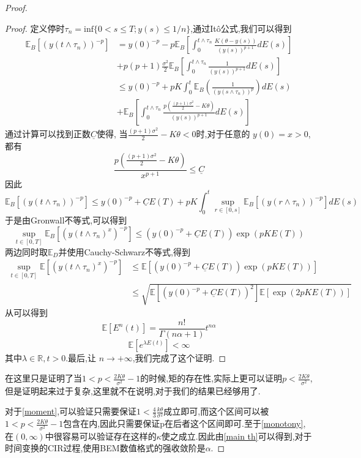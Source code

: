 \begin{proof}
\begin{proposition}
	\end{proposition}
	\begin{proof}
		定义停时$\tau_{n}=\mathrm{inf}\{0<s\leq T;y(s)\leq1/n\}$,通过It\^{o}公式,我们可以得到
		$$\begin{aligned}
			\mathbb{E}_B\left[(y(t\wedge\tau_{n}))^{-p}\right] &=y(0)^{-p}-p\mathbb{E}_B\left[\int_{0}^{t\wedge\tau_{n}}\frac{K(\theta-y(s))}{(y(s))^{p+1}}dE(s)\right]\\
			&+p(p+1)\frac{\sigma^{2}}{2}\mathbb{E}_B\left[\int_{0}^{t\wedge\tau_{n}}\frac{1}{(y(s))^{p+1}}dE(s)\right] \\
			&\leq y(0)^{-p}+pK\int_{0}^{t}\mathbb{E}_B\left(\frac{1}{(y(s\wedge\tau_{n}))^{p}}
			\right)dE(s) \\
			&+\mathbb{E}_B\left[\int_0^{t\wedge\tau_n}\frac{p\left(\frac{(p+1)\sigma^2}{2}-K\theta\right)}{(y(s))^{p+1}}dE(s)\right]
		\end{aligned}$$
		通过计算可以找到正数$\underline C$使得, 当$\frac{(p+1)\sigma^2}{2}-K\theta<0$时,对于任意的 $y(0)=x>0$,都有
		$$\frac{p\left(\frac{(p+1)\sigma^2}{2}-K\theta\right)}{x^{p+1}}\leq \underline C$$
		因此
		$$\mathbb{E}_B\left[(y(t\wedge\tau_n))^{-p}\right]\leq y(0)^{-p}+\underline{C}E(T)+pK\int_0^t\sup_{r\in[0,s]}\mathbb{E}_B\left[(y(r\wedge\tau_n))^{-p}\right]dE(s)$$
		于是由Gronwall不等式,可以得到
		$$\sup\limits_{t\in[0,T]}\mathbb{E}_B\left[(y(t\wedge\tau_n)^x)^{-p}\right]\leq\left(y(0)^{-p}+\underline{C}E(T)\right)\exp(pKE(T))$$
		两边同时取$\mathbb{E}_D$并使用Cauchy-Schwarz不等式,得到
		$$\begin{aligned}
			\sup\limits_{t\in[0,T]}\mathbb{E}\left[(y(t\wedge\tau_n)^x)^{-p}\right]&\leq\mathbb{E}\left[\left(y(0)^{-p}+\underline{C}E(T)\right)\exp(pKE(T))\right]\\
			&\leq\sqrt{\mathbb{E}\left[\left(y(0)^{-p}+\underline{C}E(T)\right)^2\right]\mathbb{E}\left[\exp(2pKE(T))\right]}
		\end{aligned}$$
		从\cite{jum2014strong}可以得到
		\begin{equation}
			\mathbb{E}[E^n(t)]=\frac{n!}{\Gamma(n\alpha+1)}t^{n\alpha}
		\end{equation}
		\begin{equation}
			\mathbb{E}[e^{\lambda E(t)}]<\infty
		\end{equation}
		其中$\lambda \in \mathbb{R},t>0$.最后,让 $n\to+\infty$,我们完成了这个证明.
	\end{proof}
	\begin{remark}
		在这里只是证明了当$1<p<\frac{2K\theta}{\sigma^2}-1$的时候,矩的存在性,实际上更可以证明$p<\frac{2K\theta}{\sigma^2}$,但是证明起来过于复杂,这里就不在说明,对于我们的结果已经够用了.
	\end{remark}
	对于\cref{moment},可以验证只需要保证$1 < \frac{4}{3}\frac{k\theta}{\sigma^2}$成立即可,而这个区间可以被$1<p<\frac{2K\theta}{\sigma^2}-1$包含在内,因此只需要保证p在后者这个区间即可.至于\cref{monotony},在$(0,\infty)$中很容易可以验证存在这样的$\kappa$使之成立.因此由\cref{main th}可以得到,对于时间变换的CIR过程,使用BEM数值格式的强收敛阶是$\alpha$.
	

\end{proof}
